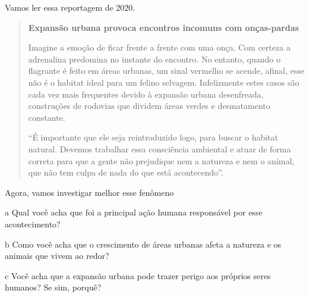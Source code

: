 
Vamos ler essa reportagem de 2020.

\begin{quote}
\textbf{Expansão urbana provoca encontros incomuns com onças-pardas}

Imagine a emoção de ficar frente a frente com uma onça. Com certeza a
adrenalina predomina no instante do encontro. No entanto, quando o
flagrante é feito em áreas urbanas, um sinal vermelho se acende, afinal,
esse não é o habitat ideal para um felino selvagem. Infelizmente estes
casos são cada vez mais frequentes devido à expansão urbana desenfreada,
construções de rodovias que dividem áreas verdes e desmatamento
constante.

``É importante que ele seja reintroduzido logo, para buscar o habitat
natural. Devemos trabalhar essa consciência ambiental e atuar de forma
correta para que a gente não prejudique nem a natureza e nem o animal,
que não tem culpa de nada do que está acontecendo''.

\end{quote}

Agora, vamos investigar melhor esse fenômeno

\num{a} Qual você acha que foi a principal ação humana responsável por esse
acontecimento?


\num{b} Como você acha que o crescimento de áreas urbanas afeta a natureza e os
animais que vivem ao redor?


\num{c} Você acha que a expansão urbana pode trazer perigo aos próprios seres
humanos? Se sim, porquê?


